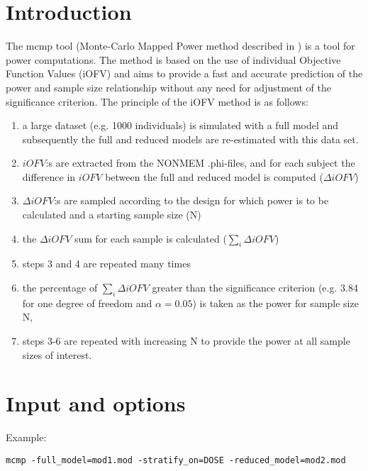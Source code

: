 




\maketitle
\newcommand{\guidetoolname}{mcmp}


\section{Introduction}
The mcmp tool (Monte-Carlo Mapped Power method described in \cite{Vong}) is a tool for power computations.
The method is based on the use of individual Objective Function Values (iOFV) and aims to provide a fast and accurate prediction of the power and sample size relationship without any need for adjustment of the significance criterion.
The principle of the iOFV method is as follows:
\begin{enumerate}
\item a large dataset (e.g. 1000 individuals) is simulated with a full model and subsequently the full and reduced models are re-estimated with this data set. 
\item $iOFV$:s are extracted from the NONMEM .phi-files, and for each subject the difference in $iOFV$ between the full and reduced model is computed ($\Delta iOFV$)
\item $\Delta iOFV$:s are sampled according to the design for which power is to be calculated and a starting sample size (N)
\item the $\Delta iOFV$ sum for each sample is calculated ($\sum_i{\Delta iOFV}$) 
\item steps 3 and 4 are repeated many times 
\item the percentage of $\sum_i{\Delta iOFV}$ greater than the significance criterion (e.g. 3.84 for one degree of freedom and $\alpha=0.05$) is taken as the power for sample size N, 
\item steps 3-6 are repeated with increasing N to provide the power at all sample sizes of interest.
\end{enumerate}

\section{Input and options}

\noindent Example:
\begin{verbatim}
mcmp -full_model=mod1.mod -stratify_on=DOSE -reduced_model=mod2.mod 
\end{verbatim}

